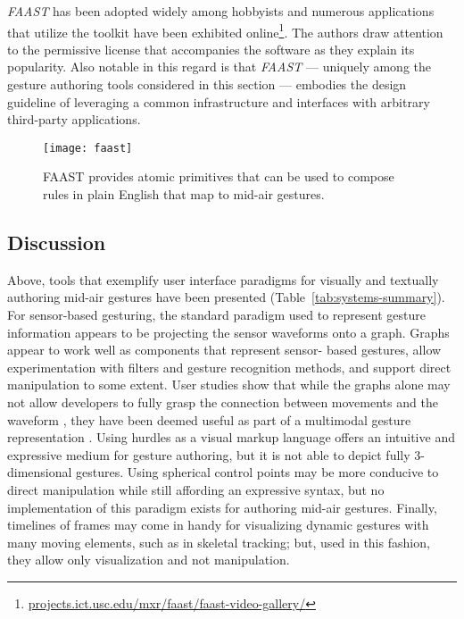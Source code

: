 \emph{FAAST} has been adopted widely among hobbyists and numerous applications that utilize the toolkit have been exhibited online\footnote{\href{http://projects.ict.usc.edu/mxr/faast/faast-video-gallery/}{projects.ict.usc.edu/mxr/faast/faast-video-gallery/}}. The authors draw attention to the permissive license that accompanies the software as they explain its popularity. Also notable in this regard is that \emph{FAAST} --- uniquely among the gesture authoring tools considered in this section --- embodies the design guideline of leveraging a common infrastructure and interfaces with arbitrary third-party applications.

\begin{SCfigure}[\sidecaptionrelwidth][ht]
\centering
\texttt{[image: faast]}
\caption{FAAST \parencite{Suma:2013} provides atomic primitives that can be used to compose rules in plain English that map to mid-air gestures.}
\label{fig:faast}
\end{SCfigure}

\subsection{Discussion}

Above, tools that exemplify user interface paradigms for visually and textually authoring mid-air gestures have been presented (Table~\ref{tab:systems-summary}). For sensor-based gesturing, the standard paradigm used to represent gesture information appears to be projecting the sensor waveforms onto a graph. Graphs appear to work well as components that represent sensor- based gestures, allow experimentation with filters and gesture recognition methods, and support direct manipulation to some extent. User studies show that while the graphs alone may not allow developers to fully grasp the connection between movements and the waveform \parencite{Ashbrook:2010}, they have been deemed useful as part of a multimodal gesture representation \parencite{Zamborlin:2014}. Using hurdles as a visual markup language offers an intuitive and expressive medium for gesture authoring, but it is not able to depict fully 3-dimensional gestures. Using spherical control points may be more conducive to direct manipulation while still affording an expressive syntax, but no implementation of this paradigm exists for authoring mid-air gestures. Finally, timelines of frames may come in handy for visualizing dynamic gestures with many moving elements, such as in skeletal tracking; but, used in this fashion, they allow only visualization and not manipulation.

